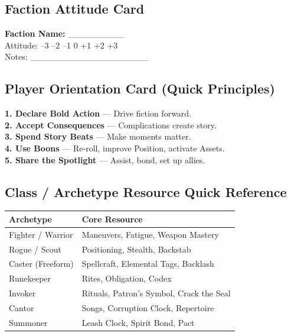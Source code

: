 \subsection{Faction Attitude Card}

\begin{tcolorbox}[colback=white,colframe=black,left=1em,right=1em,top=0.5em,bottom=0.5em]
\textbf{Faction Name:} \_\_\_\_\_\_\_\_\_ \\
Attitude: --3 --2 --1 0 +1 +2 +3 \\
Notes: \_\_\_\_\_\_\_\_\_\_\_\_\_\_\_\_\_\_\_
\end{tcolorbox}

\subsection{Player Orientation Card (Quick Principles)}

\begin{tcolorbox}[colback=white,colframe=black,left=1em,right=1em]
\textbf{1. Declare Bold Action} --- Drive fiction forward. \\
\textbf{2. Accept Consequences} --- Complications create story. \\
\textbf{3. Spend Story Beats} --- Make moments matter. \\
\textbf{4. Use Boons} --- Re‑roll, improve Position, activate Assets. \\
\textbf{5. Share the Spotlight} --- Assist, bond, set up allies.
\end{tcolorbox}

\subsection{Class / Archetype Resource Quick Reference}

\begin{center}
\begin{tabular}{|l|l|}
\hline
\textbf{Archetype} & \textbf{Core Resource} \\
\hline
Fighter / Warrior & Maneuvers, Fatigue, Weapon Mastery \\
Rogue / Scout & Positioning, Stealth, Backstab \\
Caster (Freeform) & Spellcraft, Elemental Tags, Backlash \\
Runekeeper & Rites, Obligation, Codex \\
Invoker & Rituals, Patron's Symbol, Crack the Seal \\
Cantor & Songs, Corruption Clock, Repertoire \\
Summoner & Leash Clock, Spirit Bond, Pact \\
\hline
\end{tabular}
\end{center}

